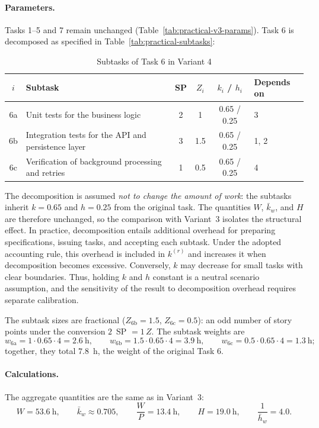\paragraph{Parameters.}
Tasks 1--5 and 7 remain unchanged (Table~\ref{tab:practical-v3-params}). Task 6
is decomposed as specified in Table~\ref{tab:practical-subtasks}:

\begin{table}[ht!]
\centering
\footnotesize
\caption{Subtasks of Task 6 in Variant 4}
\label{tab:practical-v4-params}
\begin{tabular}{clcccl}
\toprule
$i$ & Subtask & SP & $Z_i$ & $k_i$ / $h_i$ & Depends on \\
\midrule
6a & Unit tests for the business logic & 2 & 1 & 0.65 / 0.25 & 3 \\
6b & Integration tests for the API and persistence layer & 3 & 1.5 & 0.65 / 0.25 & 1, 2 \\
6c & Verification of background processing and retries & 1 & 0.5 & 0.65 / 0.25 & 4 \\
\bottomrule
\end{tabular}
\end{table}

The decomposition is assumed \emph{not to change the amount of work}: the
subtasks inherit $k = 0.65$ and $h = 0.25$ from the original task. The
quantities $W$, $\bar{k}_w$, and $H$ are therefore unchanged, so the comparison
with Variant~3 isolates the structural effect. In practice, decomposition
entails additional overhead for preparing specifications, issuing tasks, and
accepting each subtask. Under the adopted accounting rule, this overhead is
included in $k^{(r)}$ and increases it when decomposition becomes excessive.
Conversely, $k$ may decrease for small tasks with clear boundaries. Thus, holding $k$ and
$h$ constant is a neutral scenario assumption, and the sensitivity of the
result to decomposition overhead requires separate calibration.

The subtask sizes are fractional ($Z_{6\text{b}} = 1.5$,
$Z_{6\text{c}} = 0.5$): an odd number of story points under the conversion
$2$~SP $= 1\,Z$. The subtask weights are
\[
  w_{6\text{a}} = 1 \cdot 0.65 \cdot 4 = 2.6~\text{h}, \qquad
  w_{6\text{b}} = 1.5 \cdot 0.65 \cdot 4 = 3.9~\text{h}, \qquad
  w_{6\text{c}} = 0.5 \cdot 0.65 \cdot 4 = 1.3~\text{h};
\]
together, they total $7.8$~h, the weight of the original Task 6.

\paragraph{Calculations.}
The aggregate quantities are the same as in Variant~3:
\[
  W = 53.6~\text{h}, \qquad
  \bar{k}_w \approx 0.705, \qquad
  \frac{W}{P} = 13.4~\text{h}, \qquad
  H = 19.0~\text{h}, \qquad
  \frac{1}{\bar{h}_w} = 4.0.
\]

